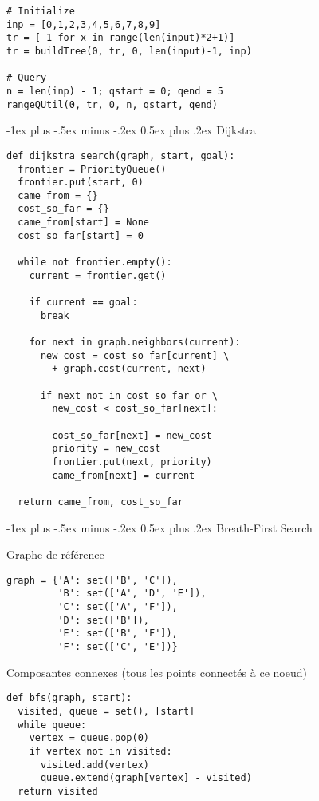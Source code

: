 \documentclass[10pt,landscape]{article}
\makeatletter
\renewcommand{\section}{\@startsection{section}{1}{0mm}%
                                {-1ex plus -.5ex minus -.2ex}%
                                {0.5ex plus .2ex}%
                                {\normalfont\large\bfseries}}
\makeatother
\begin{document}
\begin{multicols}{3}
\begin{verbatim}
# Initialize
inp = [0,1,2,3,4,5,6,7,8,9]
tr = [-1 for x in range(len(input)*2+1)]
tr = buildTree(0, tr, 0, len(input)-1, inp)

# Query
n = len(inp) - 1; qstart = 0; qend = 5
rangeQUtil(0, tr, 0, n, qstart, qend)
\end{verbatim}

\section{Dijkstra}

\begin{verbatim}
def dijkstra_search(graph, start, goal):
  frontier = PriorityQueue()
  frontier.put(start, 0)
  came_from = {}
  cost_so_far = {}
  came_from[start] = None
  cost_so_far[start] = 0

  while not frontier.empty():
    current = frontier.get()

    if current == goal:
      break

    for next in graph.neighbors(current):
      new_cost = cost_so_far[current] \
        + graph.cost(current, next)

      if next not in cost_so_far or \
        new_cost < cost_so_far[next]:

        cost_so_far[next] = new_cost
        priority = new_cost
        frontier.put(next, priority)
        came_from[next] = current

  return came_from, cost_so_far
\end{verbatim}

\section{Breath-First Search}


Graphe de référence

\begin{verbatim}
graph = {'A': set(['B', 'C']),
         'B': set(['A', 'D', 'E']),
         'C': set(['A', 'F']),
         'D': set(['B']),
         'E': set(['B', 'F']),
         'F': set(['C', 'E'])}
\end{verbatim}

Composantes connexes (tous les points connectés à ce noeud)

\begin{verbatim}
def bfs(graph, start):
  visited, queue = set(), [start]
  while queue:
    vertex = queue.pop(0)
    if vertex not in visited:
      visited.add(vertex)
      queue.extend(graph[vertex] - visited)
  return visited


\end{verbatim}
\end{multicols}
\end{document}
